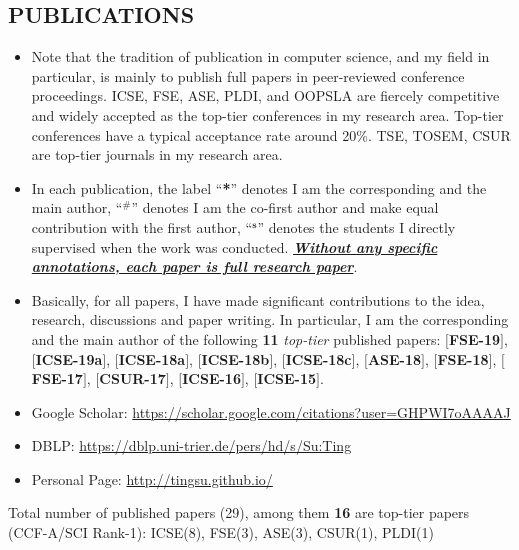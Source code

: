\documentclass[margin]{res}
\begin{document}
\begin{resume}
\section{PUBLICATIONS}
\begin{itemize}[leftmargin=*]
    \item Note that the tradition of publication in computer science, and my field in particular, is mainly
to publish full papers in peer-reviewed conference proceedings. ICSE, FSE, ASE, PLDI, and OOPSLA are fiercely competitive and widely accepted as the top-tier conferences in my research area. Top-tier conferences have a typical acceptance rate around 20\%. TSE, TOSEM, CSUR are top-tier journals in my research area.
    \item In each publication, the label ``\textbf{*}'' denotes I am the corresponding and the main author, ``$^{\textbf{\#}}$'' denotes I am the co-first author and make equal contribution with the first author,  ``$^{\textbf{s}}$'' denotes the students I directly supervised when the work was conducted. \emph{\textbf{\underline{Without any specific annotations, each paper is full research paper}}}.
    \item Basically, for all papers, I have made significant contributions to the idea, research, discussions and paper writing. In particular, I am the corresponding and the main author of the following \textbf{11} \emph{top-tier} published papers: $[$\textbf{FSE-19}$]$, $[$\textbf{ICSE-19a}$]$, $[$\textbf{ICSE-18a}$]$, $[$\textbf{ICSE-18b}$]$, $[$\textbf{ICSE-18c}$]$, $[$\textbf{ASE-18}$]$, $[$\textbf{FSE-18}$]$, $[$\textbf{FSE-17}$]$, $[$\textbf{CSUR-17}$]$, $[$\textbf{ICSE-16}$]$, $[$\textbf{ICSE-15}$]$.
\end{itemize}

\begin{itemize}[leftmargin=*]
    \item Google Scholar: \url{https://scholar.google.com/citations?user=GHPWI7oAAAAJ}
    \item DBLP: \url{https://dblp.uni-trier.de/pers/hd/s/Su:Ting}
    \item Personal Page: \url{http://tingsu.github.io/}
\end{itemize}

 Total number of published papers (29), among them \textbf{16} are top-tier papers (CCF-A/SCI Rank-1): ICSE(8), FSE(3), ASE(3), CSUR(1), PLDI(1)


\end{resume}
\end{document}

